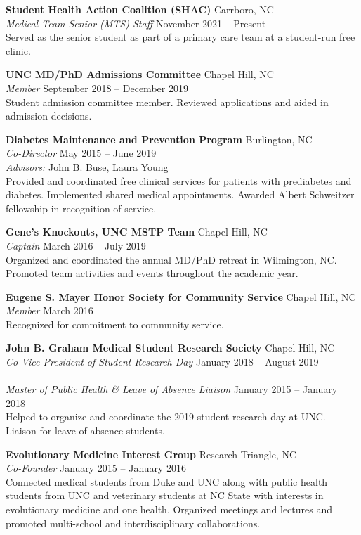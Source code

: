 \documentclass[11pt,letterpaper]{article}
\newcommand{\entry}[4]{%
  \textbf{#1} \hfill #2 \\
  \textit{#3} \hfill #4 \\[2pt]
}
\begin{document}
\vspace{6pt}

\entry{Student Health Action Coalition (SHAC)}{Carrboro, NC}{Medical Team Senior (MTS) Staff}{November 2021 -- Present}
Served as the senior student as part of a primary care team at a student-run free clinic.

\vspace{6pt}

\entry{UNC MD/PhD Admissions Committee}{Chapel Hill, NC}{Member}{September 2018 -- December 2019}
Student admission committee member. Reviewed applications and aided in admission decisions.

\vspace{6pt}

\entry{Diabetes Maintenance and Prevention Program}{Burlington, NC}{Co-Director}{May 2015 -- June 2019}
\textit{Advisors:} John B. Buse, Laura Young \\[2pt]
Provided and coordinated free clinical services for patients with prediabetes and diabetes. Implemented shared medical appointments. Awarded Albert Schweitzer fellowship in recognition of service.

\vspace{6pt}

\entry{Gene's Knockouts, UNC MSTP Team}{Chapel Hill, NC}{Captain}{March 2016 -- July 2019}
Organized and coordinated the annual MD/PhD retreat in Wilmington, NC. Promoted team activities and events throughout the academic year.

\vspace{6pt}

\entry{Eugene S. Mayer Honor Society for Community Service}{Chapel Hill, NC}{Member}{March 2016}
Recognized for commitment to community service.

\vspace{6pt}

\entry{John B. Graham Medical Student Research Society}{Chapel Hill, NC}{Co-Vice President of Student Research Day}{January 2018 -- August 2019}
\entry{}{}{Master of Public Health \& Leave of Absence Liaison}{January 2015 -- January 2018}
Helped to organize and coordinate the 2019 student research day at UNC. Liaison for leave of absence students.

\vspace{6pt}

\entry{Evolutionary Medicine Interest Group}{Research Triangle, NC}{Co-Founder}{January 2015 -- January 2016}
Connected medical students from Duke and UNC along with public health students from UNC and veterinary students at NC State with interests in evolutionary medicine and one health. Organized meetings and lectures and promoted multi-school and interdisciplinary collaborations.
\end{document}
